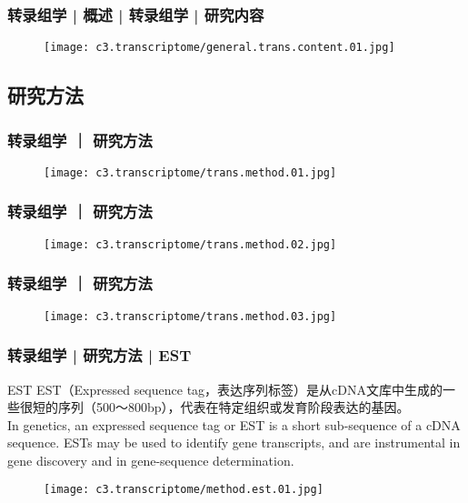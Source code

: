\begin{frame}
  \frametitle{转录组学 | 概述 | 转录组学 | 研究内容}
  \begin{figure}
    \centering
    \texttt{[image: c3.transcriptome/general.trans.content.01.jpg]}
  \end{figure}
\end{frame}

\subsection{研究方法}
\begin{frame}
  \frametitle{转录组学 ｜ 研究方法}
  \begin{figure}
    \centering
    \texttt{[image: c3.transcriptome/trans.method.01.jpg]}
  \end{figure}
\end{frame}

\begin{frame}
  \frametitle{转录组学 ｜ 研究方法}
  \begin{figure}
    \centering
    \texttt{[image: c3.transcriptome/trans.method.02.jpg]}
  \end{figure}
\end{frame}

\begin{frame}
  \frametitle{转录组学 ｜ 研究方法}
  \begin{figure}
    \centering
    \texttt{[image: c3.transcriptome/trans.method.03.jpg]}
  \end{figure}
\end{frame}

\begin{frame}
  \frametitle{转录组学 | 研究方法 | EST}
  {\footnotesize
  \begin{block}{EST}
    EST（Expressed sequence tag，表达序列标签）是从cDNA文库中生成的一些很短的序列（500～800bp），代表在特定组织或发育阶段表达的基因。\\
    \vspace{0.2em}
    In genetics, an expressed sequence tag or EST is a short sub-sequence of a cDNA sequence. ESTs may be used to identify gene transcripts, and are instrumental in gene discovery and in gene-sequence determination.
  \end{block}
  }
  \begin{figure}
    \centering
    \texttt{[image: c3.transcriptome/method.est.01.jpg]}
  \end{figure}
\end{frame}

